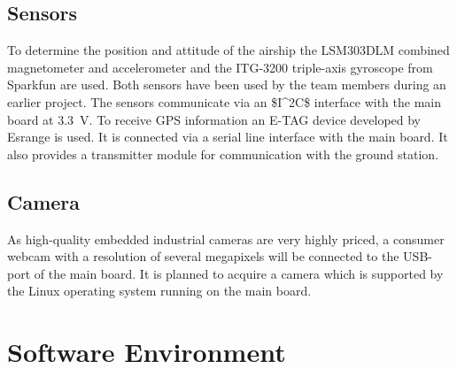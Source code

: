 \subsection{Sensors}

To determine the position and attitude of the airship the LSM303DLM \cite{LSM303:datasheet} combined magnetometer and accelerometer and the ITG-3200 triple-axis gyroscope \cite{ITG-3200:datasheet} from Sparkfun are used. Both sensors have been used by the team members during an earlier project. The sensors communicate via an \ac{$I^2C$} interface with the main board at 3.3~V. To receive \ac{GPS} information an E-TAG device developed by Esrange is
used. It is connected via a serial line interface with the main board. It also provides a transmitter module for communication with the ground station.

\subsection{Camera}

As high-quality embedded industrial cameras are very highly priced, a consumer webcam with a resolution of several megapixels will be connected to the \ac{USB}-port of the main board. It is planned to acquire a camera which is supported by the Linux operating system running on the main board.


\FloatBarrier
\section{Software Environment}

